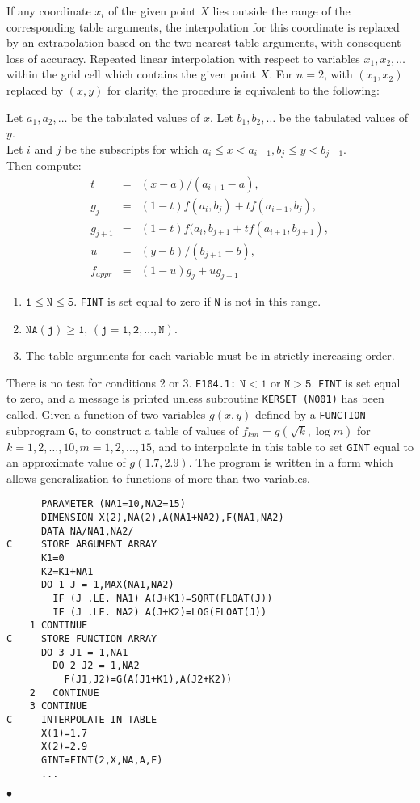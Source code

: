 If any coordinate $x_i$ of the given point $X$ lies
outside the range of the corresponding table arguments, the
interpolation for this coordinate is replaced by an extrapolation
based on the two nearest table arguments, with consequent loss of
accuracy.
\Method
Repeated linear interpolation with respect to variables $x_1,
x_2,\ldots$ within the grid cell which contains the given point $X$. For
$n=2$, with $(x_1,x_2)$ replaced by $(x,y)$ for clarity, the
procedure is equivalent to the following:
\par
Let $a_1,a_2,\ldots$ be the tabulated values of $x$.
Let $b_1,b_2,\ldots$ be the tabulated values of $y$. \\
Let $i$ and $j$ be the subscripts for which
$a_i\leq x<a_{i+1}, b_j\leq y <b_{j+1}$. \\
Then compute:
\begin{eqnarray*}
t & = & (x-a)/(a_{i+1}-a),\\
g_j & = & (1-t)f(a_i,b_j)+t f(a_{i+1},b_j),\\
g_{j+1} & = & (1-t)f(a_i,b_{j+1}+t f(a_{i+1},b_{j+1}),\\
u & = &  (y-b)/(b_{j+1}-b),\\
f_{appr}  & = &  (1-u) g_j + u g_{j+1}
\end{eqnarray*}
\Restrict
\begin{enumerate}
\item  $\mathtt{1\leq N \leq 5}$. {\tt FINT} is set equal to zero if
{\tt N} is not in this range.
\item  $\mathtt{NA(j) \geq 1,\,(j=1,2,\ldots,N)}.$
\item The table arguments for each variable must be in strictly
increasing order.
\end{enumerate}
There is no test for conditions 2 or 3.
\Errorh
{\tt E104.1:}  $\mathtt{N<1}$ or $\mathtt{N>5}$.
{\tt FINT} is set equal to zero, and a message is printed unless
subroutine {\tt KERSET (N001)} has been called.
\Examples
Given a function of two variables $g(x,y)$ defined by a {\tt FUNCTION}
subprogram {\tt G}, to construct a table of values of
$f_{km} = g(\sqrt{k},\log m)$ for $k=1,2,\ldots,10, m=1,2,\ldots,15$,
and to interpolate in this table to set {\tt GINT} equal to an
approximate value of $g(1.7,2.9)$. The program is written in a form which
allows generalization to functions of more than two variables.
\begin{verbatim}
      PARAMETER (NA1=10,NA2=15)
      DIMENSION X(2),NA(2),A(NA1+NA2),F(NA1,NA2)
      DATA NA/NA1,NA2/
C     STORE ARGUMENT ARRAY
      K1=0
      K2=K1+NA1
      DO 1 J = 1,MAX(NA1,NA2)
        IF (J .LE. NA1) A(J+K1)=SQRT(FLOAT(J))
        IF (J .LE. NA2) A(J+K2)=LOG(FLOAT(J))
    1 CONTINUE
C     STORE FUNCTION ARRAY
      DO 3 J1 = 1,NA1
        DO 2 J2 = 1,NA2
          F(J1,J2)=G(A(J1+K1),A(J2+K2))
    2   CONTINUE
    3 CONTINUE
C     INTERPOLATE IN TABLE
      X(1)=1.7
      X(2)=2.9
      GINT=FINT(2,X,NA,A,F)
      ...
\end{verbatim}
$\bullet$
